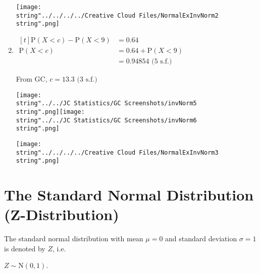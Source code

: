 \documentclass[11pt,a4paper]{book}
\begin{document}
\begin{example}
\begin{enumerate}[label=(\alph*)]
\begin{minipage}[t]{.6\textwidth}
\end{minipage}
\begin{minipage}[t]{.3\textwidth}
\begin{center}
\texttt{[image: \\string"../../../../Creative Cloud Files/NormalExInvNorm2\\string".png]}
\par\end{center}

\end{minipage}

\item 
$
\begin{aligned}[t]
\text{P}\left(X<c\right)-\text{P}\left(X<9\right) & =0.64\\
\text{P}\left(X<c\right) & =0.64+\text{P}\left(X<9\right)\\
 & =0.94854\text{ (5 s.f.)}
\end{aligned}
$

\begin{minipage}[t]{.6\textwidth}

From GC, $c=13.3\text{ (3 s.f.)}$

\texttt{[image: \\string"../../JC Statistics/GC Screenshots/invNorm5\\string".png]}\hspace{1cm}\texttt{[image: \\string"../../JC Statistics/GC Screenshots/invNorm6\\string".png]}

\end{minipage}
\begin{minipage}[t]{.3\textwidth}
\begin{center}
\texttt{[image: \\string"../../../../Creative Cloud Files/NormalExInvNorm3\\string".png]}
\par\end{center}

\end{minipage}

\end{enumerate}

\end{example}

\section{The Standard Normal Distribution (Z-Distribution)}

The standard normal distribution with mean $\mu=0$ and standard deviation $\sigma=1$ is denoted by $Z$, i.e. 

$Z\sim\text{N}\left(0,1\right)$. 
\end{document}

